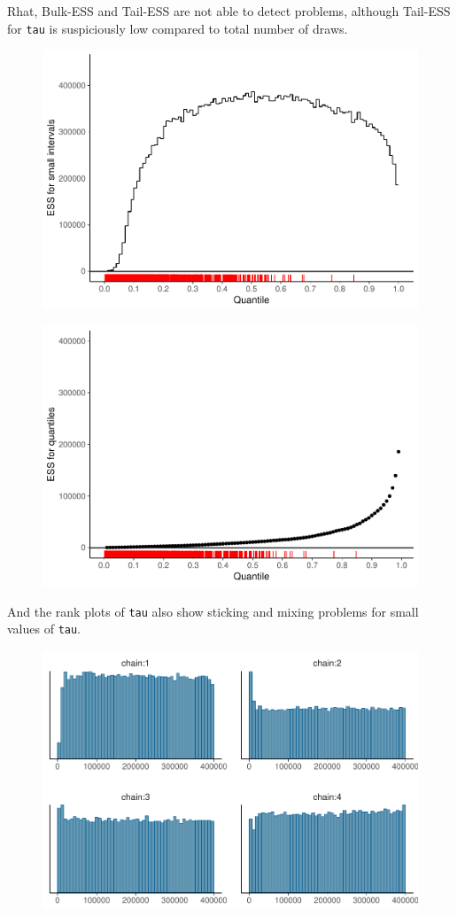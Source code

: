 \documentclass[american,]{article}
\begin{document}
Rhat, Bulk-ESS and Tail-ESS are not able to detect problems, although
Tail-ESS for \texttt{tau} is suspiciously low compared to total number
of draws.

\begin{figure}[t]
  \centering
  \includegraphics[width=0.6\linewidth]{graphics/local-ess-fit-cp3-tau-1.pdf}
\end{figure}

\begin{figure}[t]
  \centering
  \includegraphics[width=0.6\linewidth]{graphics/quantile-ess-fit-cp3-tau-1.pdf}
\end{figure}

And the rank plots of \texttt{tau} also show sticking and mixing
problems for small values of \texttt{tau}.

\begin{figure}[t]
  \centering
  \includegraphics[width=0.6\linewidth]{graphics/hist-fit-cp3-tau-1.pdf}
\end{figure}
\end{document}
